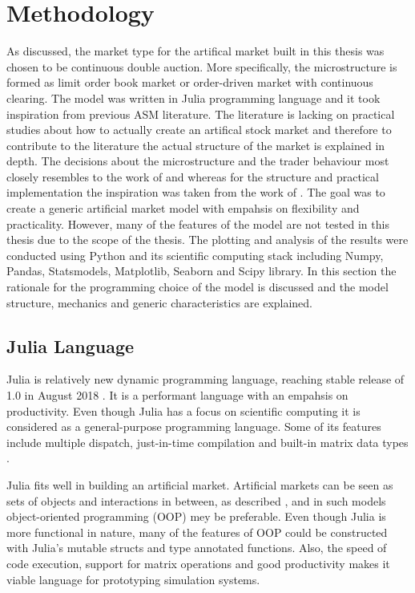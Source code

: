 
\section{Methodology}

As discussed, the market type for the artifical market built in this thesis was chosen 
to be continuous double auction. More specifically, the microstructure is formed as 
limit order book market or order-driven market with continuous clearing. The model was written in Julia
programming language and it took inspiration from previous ASM literature.
The literature is lacking on practical studies about how to actually create
an artifical stock market and therefore to contribute to the literature %
the actual structure of the market is explained in depth. The decisions 
about the microstructure and the trader behaviour most closely resembles to the 
work of \citet{Genoa01} and \citet{Raberto05} whereas for the structure and 
practical implementation the inspiration was taken from the work of \citet{Ben12}. 
The goal was to create a generic artificial market model with empahsis on flexibility 
and practicality. However, many of the features of the model are not tested in this thesis 
due to the scope of the thesis. The plotting and analysis of the results were 
conducted using Python and its scientific computing stack including Numpy, Pandas, 
Statsmodels, Matplotlib, Seaborn and Scipy library. In this section the rationale 
for the programming choice of the model is discussed and the model structure, 
mechanics and generic characteristics are explained.

\subsection{Julia Language}
Julia is relatively new dynamic programming language, 
reaching stable release of 1.0 in August 2018 \citep{JuliaV1}.
It is a performant language with an empahsis
on productivity. Even though Julia has a focus on scientific 
computing it is considered as a general-purpose programming
language. Some of its features include
multiple dispatch, just-in-time compilation and built-in
matrix data types \citep{Julia}.

Julia fits well in building an artificial market.
Artificial markets can be seen as sets of objects
and interactions in between, as described \citet{Ben12},
and in such models object-oriented programming (OOP)
mey be preferable. Even though Julia is more functional in nature, 
many of the features of OOP could be constructed with Julia's mutable structs 
and type annotated functions. Also, the speed of code execution, 
support for matrix operations and good productivity makes 
it viable language for prototyping simulation systems. 


